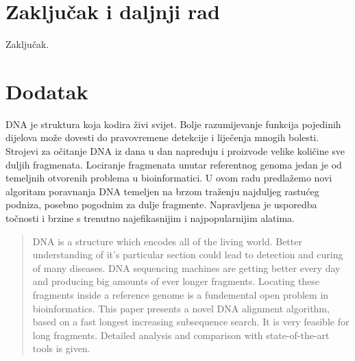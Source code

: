 \documentclass[times, utf8, diplomski]{fer}
\begin{document}
\chapter{Zaključak i daljnji rad}
Zaključak.

\chapter{Dodatak}




\begin{sazetak}

DNA je struktura koja kodira živi svijet. Bolje razumijevanje funkcija pojedinih dijelova može dovesti do pravovremene detekcije i liječenja mnogih bolesti. Strojevi za očitanje DNA iz dana u dan napreduju i proizvode velike količine sve duljih fragmenata. Lociranje fragmenata unutar referentnog genoma jedan je od temeljnih otvorenih problema u bioinformatici. U ovom radu predlažemo novi algoritam poravnanja DNA temeljen na brzom traženju najduljeg rastućeg podniza, posebno pogodnim za dulje fragmente. Napravljena je usporedba točnosti i brzine s trenutno najefikasnijim i najpopularnijim alatima.

\end{sazetak}

\begin{abstract}
DNA is a structure which encodes all of the living world. Better understanding of it's particular section could lead to detection and curing of many diseases. DNA sequencing machines are getting better every day and producing
big amounts of ever longer fragments. Locating these fragments inside a reference genome is a fundemental open
problem in bioinformatics. This paper presents a novel DNA alignment algorithm, based on a fast longest increasing subsequence search. It is very feasible for long fragments. Detailed analysis and comparison with state-of-the-art tools is given.

\end{abstract}
\end{document}
